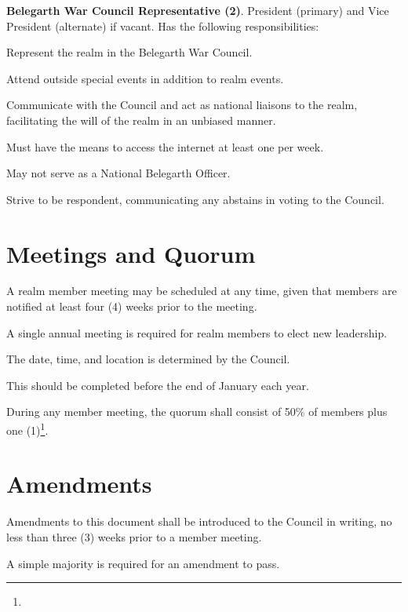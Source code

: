 \documentclass[12pt]{article}
\newcommand{\newpart}[2][]{\colorbox{green!40}{#2}\expandafter\ifx\expandafter\relax\detokenize{#1}\relax\else\textnormal{\footnote{#1}}\fi}
\begin{document}
\begin{level}
\begin{level}
\begin{level}
    \end{level}
    \item \textbf{Belegarth War Council Representative (2)}. President (primary) and Vice President (alternate) if vacant. Has the following responsibilities:
    \begin{level}
        \item Represent the realm in the Belegarth War Council.
        \item Attend outside special events in addition to realm events.
        \item Communicate with the Council and act as national liaisons to the realm, facilitating the will of the realm in an unbiased manner.
        \item Must have the means to access the internet at least one per week.
        \item May not serve as a National Belegarth Officer.
        \item Strive to be respondent, communicating any abstains in voting to the Council.
    \end{level}
\end{level}

\end{level}

\section{Meetings and Quorum}\label{yearly_meeting}
\begin{level} 
    \item A realm member meeting may be scheduled at any time, given that members are notified at least four (4) weeks prior to the meeting.
    \item A single annual meeting is required for realm members to elect new leadership. 
    \begin{level}
        \item The date, time, and location is determined by the Council. 
        \item This should be completed before the end of January each year.
    \end{level}
    \item During any member meeting, \newpart{the quorum shall consist of 50\% of members plus one (1)}.
\end{level}

\section{Amendments}\label{amendments}
\begin{level} 
    \item Amendments to this document shall be introduced to the Council in writing, no less than three (3) weeks prior to a member meeting. 
    \item A simple majority is required for an amendment to pass.
\end{level}
\end{document}
